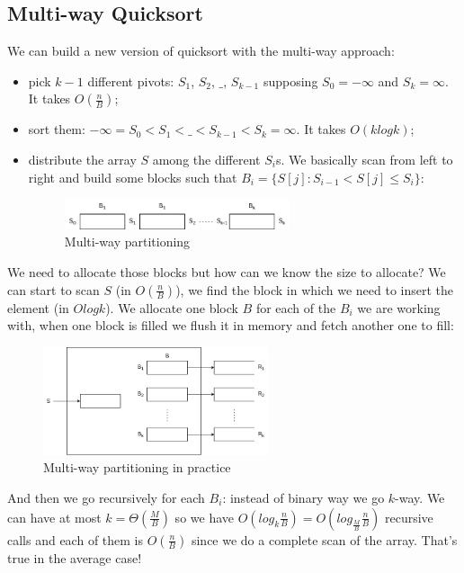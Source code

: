 \subsection{Multi-way Quicksort}
We can build a new version of quicksort with the multi-way approach:
\begin{itemize}
    \item pick $k-1$ different pivots: $S_1$, $S_2$, $\_$, $S_{k-1}$ supposing $S_0 = - \infty$ and $S_k = \infty$.
    It takes $O\left(\frac{n}{B} \right)$;

    \item sort them: $- \infty = S_0 < S_1 < \_ < S_{k-1}  < S_k = \infty$. It takes $O(k logk)$;
    
    \item distribute the array $S$ among the different $S_i$s. We basically scan from left to right and build some blocks such that $B_i = \{ S[j] : S_{i-1} < S[j] \leq S_i  \}$:
    \begin{figure}[H]
        \centering
        \includegraphics[width=250px]{images/2_Sorting/multiway-partitioning.png}
        \caption{Multi-way partitioning}
    \end{figure}
\end{itemize}
We need to allocate those blocks but how can we know the size to allocate?
We can start to scan $S$ (in $O \left(\frac{n}{B} \right)$), we find the block in which we need to insert the element (in $Ologk$).
We allocate one block $B$ for each of the $B_i$ we are working with, when one block is filled we flush it in memory and fetch another one to fill:

\begin{figure}[H]
    \centering
    \includegraphics[width=250px]{images/2_Sorting/multiway-partitioning-practice.png}
    \caption{Multi-way partitioning in practice}
\end{figure}
And then we go recursively for each $B_i$: instead of binary way we go $k$-way.
We can have at most $k = \Theta \left( \frac{M}{B} \right)$ so we have $O\left( log_k \frac{n}{B} \right) = O\left( log_{\frac{M}{B}} \frac{n}{B} \right)$ recursive calls and each of them is $O\left( \frac{n}{B} \right)$ since we do a complete scan of the array.
That's true in the average case!

